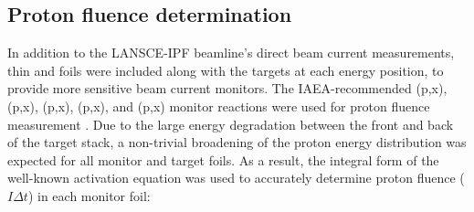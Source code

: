 

\subsection{Proton fluence determination}\label{sec:dosimetry}


% 
% 
% 
In addition to the LANSCE-IPF beamline's direct beam current measurements, thin  and  foils were included along with the  targets at each energy position, to provide more sensitive beam current monitors.
The IAEA-recommended (p,x), (p,x), (p,x), (p,x), and (p,x) monitor reactions were used for  proton fluence measurement \cite{gul2001charged}.
Due to the large energy degradation between the front and  back of the target stack, a non-trivial broadening of the proton energy distribution was expected for all monitor and target foils.
As a result, the integral form of the well-known activation equation was used to accurately determine proton fluence ($I \Delta t $) in each monitor foil:

